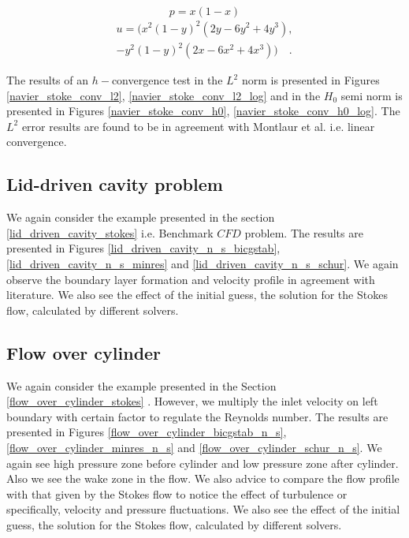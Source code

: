 \documentclass[a4paper,openany]{book}
\begin{document}
\begin{center}
\begin{equation}
p = x(1 - x)
\end{equation}
\begin{equation} 
\begin{split}
u = (x^2(1-y)^2(2y-6y^2+4y^3),\\-y^2(1-y)^2(2x-6x^2+4x^3)) \quad \textrm{.}
\end{split}
\end{equation}
\end{center}

The results of an $h-$convergence test in the $L^2$ norm is presented in Figures \ref{navier_stoke_conv_l2}, \ref{navier_stoke_conv_l2_log} and in the $H_0$ semi norm is presented in Figures \ref{navier_stoke_conv_h0}, \ref{navier_stoke_conv_h0_log}. The $L^2$ error results are found to be in agreement with Montlaur et al. \cite{Montlaur} i.e. linear convergence.\\

\subsection{Lid-driven cavity problem} \label{lid_driven_cavity_navier_stokes}

We again consider the example presented in the section \ref{lid_driven_cavity_stokes} i.e. Benchmark $CFD$ problem. The results are presented in Figures \ref{lid_driven_cavity_n_s_bicgstab}, \ref{lid_driven_cavity_n_s_minres} and \ref{lid_driven_cavity_n_s_schur}. We again observe the boundary layer formation and velocity profile in agreement with literature. We also see the effect of the initial guess, the solution for the Stokes flow, calculated by different solvers. 

\subsection{Flow over cylinder} \label{flow_over_cylinder_navier_stokes}

We again consider the example presented in the Section \ref{flow_over_cylinder_stokes} . However, we multiply the inlet velocity on left boundary with certain factor to regulate the Reynolds number. The results are presented in Figures \ref{flow_over_cylinder_bicgstab_n_s}, \ref{flow_over_cylinder_minres_n_s} and \ref{flow_over_cylinder_schur_n_s}. We again see high pressure zone before cylinder and low pressure zone after cylinder. Also we see the wake zone in the flow. We also advice to compare the flow profile with that given by the Stokes flow to notice the effect of turbulence or specifically, velocity and pressure fluctuations. We also see the effect of the initial guess, the solution for the Stokes flow, calculated by different solvers. 
\end{document}
